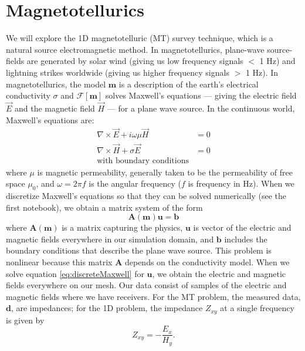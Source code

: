 \documentclass[11pt,oneside]{article}
\begin{document}
\section{Magnetotellurics}
We will explore the 1D magnetotelluric (MT) survey technique, which is a natural source electromagnetic method. In magnetotellurics, plane-wave source-fields are generated by solar wind (giving us low frequency signals $<$ 1 Hz) and lightning strikes worldwide (giving us higher frequency signals $>$ 1 Hz). In magnetotellurics, the model $\mathbf{m}$ is a description of the earth’s electrical conductivity $\sigma$ and $\mathcal{F}[\mathbf{m}]$ solves Maxwell’s equations --- giving the electric field $\vec{E}$ and the magnetic field $\vec{H}$ --- for a plane wave source. In the continuous world, Maxwell’s equations are:
\begin{equation}
\begin{split}
\nabla \times \vec{E} + i\omega\mu\vec{H} &= 0 \\
\nabla \times \vec{H} + \sigma\vec{E} &= 0 \\
\text{with boundary conditions}
\end{split}
\label{eq:maxwell}
\end{equation}
where $\mu$ is magnetic permeability, generally taken to be the permeability of free space $\mu_0$, and $\omega = 2 \pi f$ is the angular frequency ($f$ is frequency in Hz). When we discretize Maxwell's equations so that they can be solved numerically (see the first notebook), we obtain a matrix system of the form
\begin{equation}
    \mathbf{A}(\mathbf{m})\mathbf{u} = \mathbf{b}
    \label{eq:discreteMaxwell}
\end{equation}
where $\mathbf{A}(\mathbf{m})$ is a matrix capturing the physics, $\mathbf{u}$ is vector of the electric and magnetic fields everywhere in our simulation domain, and $\mathbf{b}$ includes the boundary conditions that describe the plane wave source. This problem is nonlinear because this matrix $\mathbf{A}$ depends on the conductivity model. When we solve equation \ref{eq:discreteMaxwell} for $\mathbf{u}$, we obtain the electric and magnetic fields everywhere on our mesh. Our data consist of samples of the electric and magnetic fields where we have receivers. For the MT problem, the measured data, $\mathbf{d}$, are impedances; for the 1D problem, the impedance $Z_{xy}$ at a single frequency is given by
\begin{equation}
Z_{xy} = -\frac{E_x}{H_y}.
\label{eq:impedance}
\end{equation}
\end{document}
